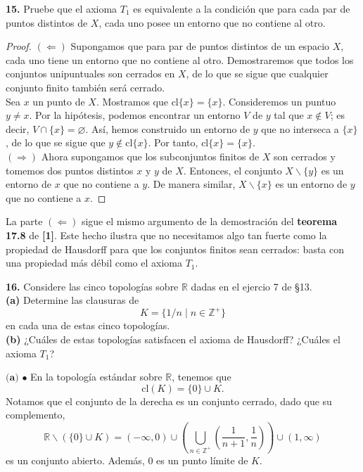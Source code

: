 \documentclass{article}
\begin{document}
\begin{mybox}
	\textbf{15. } Pruebe que el axioma $T_{1}$ es equivalente a la condición que para cada par de puntos distintos de $X$, cada uno posee un entorno que no contiene al otro. 
\end{mybox}	
\begin{proof}
	$(\Leftarrow)$ Supongamos que para par de puntos distintos de un espacio $X$, cada uno tiene un entorno que no contiene al otro. Demostraremos que todos los conjuntos unipuntuales son cerrados en $X$, de lo que se sigue que cualquier conjunto finito también será cerrado. \\
	Sea $x$ un punto de $X$. Mostramos que $\text{cl}\{x\} = \{x\}$. Consideremos un puntuo $y \neq x$. Por la hipótesis, podemos encontrar un entorno $V$ de $y$ tal que $x \notin V$; es decir, $V \cap \{x\} = \varnothing$. Así, hemos construido un entorno de $y$ que no interseca a $\{ x \}$, de lo que se sigue que $y \notin \text{cl}\{x\}$. Por tanto, $\text{cl}\{x\} = \{x\}$. \\
	$(\Rightarrow)$ Ahora supongamos que los subconjuntos finitos de $X$ son cerrados y tomemos dos puntos distintos $x$ y $y$ de $X$. Entonces, el conjunto $X \backslash \{y\}$ es un entorno de $x$ que no contiene a $y$. De manera similar, $X \backslash \{ x \}$ es un entorno de $y$ que no contiene a $x$.
\end{proof}
La parte $(\Leftarrow)$ sigue el mismo argumento de la demostración del \textbf{teorema 17.8} de \textbf{[1]}. Este hecho ilustra que no necesitamos algo tan fuerte como la propiedad de Hausdorff para que los conjuntos finitos sean cerrados: basta con una propiedad más débil como el axioma $T_{1}$. 
\vspace{0.5cm}
\begin{mybox}
	\textbf{16. }  Considere las cinco topologías sobre $\mathbb{R}$ dadas en el ejercio 7 de §13. \\
	
	\textbf{(a) }Determine las clausuras de
	$$ K = \{ 1/n \mid n \in \mathbb{Z}^{+} \} $$
	en cada una de estas cinco topologías. \\
	
	\textbf{(b)} ¿Cuáles de estas topologías satisfacen el axioma de Hausdorff? ¿Cuáles el axioma $T_{1}$?
\end{mybox}
$\textbf{(a)}$ $\bullet$ En la topología estándar sobre $\mathbb{R}$, tenemos que
$$ \text{cl}(K) = \{0 \} \cup K. $$
Notamos que el conjunto de la derecha es un conjunto cerrado, dado que su complemento,
$$ \mathbb{R} \backslash ( \{0\} \cup K) = (- \infty, 0) \cup \left( \bigcup_{n \in \mathbb{Z}^+} \left( \frac{1}{n+1},\frac{1}{n} \right) \right)  \cup (1, \infty)$$
es un conjunto abierto. Además, $0$ es un punto límite de $K$. \\
\end{document}
